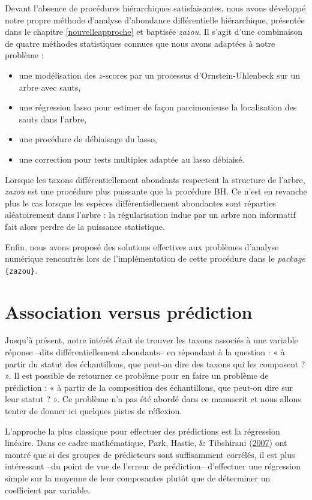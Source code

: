 \documentclass[12pt,a4paper]{reedthesis}
\theoremstyle{definition}
\theoremstyle{definition}
\theoremstyle{definition}
\theoremstyle{remark}
\begin{document}
Devant l'absence de procédures hiérarchiques satisfaisantes, nous avons développé notre propre méthode d'analyse d'abondance différentielle hiérarchique, présentée dans le chapitre \ref{nouvelleapproche} et baptisée \emph{zazou}. Il s'agit d'une combinaison de quatre méthodes statistiques connues que nous avons adaptées à notre problème :
\begin{itemize}
\item
  une modélisation des \(z\)-scores par un processus d'Ornstein-Uhlenbeck sur un arbre avec sauts,
\item
  une régression lasso pour estimer de façon parcimonieuse la localisation des sauts dans l'arbre,
\item
  une procédure de débiaisage du lasso,
\item
  une correction pour tests multiples adaptée au lasso débiaisé.
\end{itemize}
Lorsque les taxons différentiellement abondants respectent la structure de l'arbre, \emph{zazou} est une procédure plus puissante que la procédure BH. Ce n'est en revanche plus le cas lorsque les espèces différentiellement abondantes sont réparties aléatoirement dans l'arbre : la régularisation indue par un arbre non informatif fait alors perdre de la puissance statistique.

Enfin, nous avons proposé des solutions effectives aux problèmes d'analyse numérique rencontrés lors de l'implémentation de cette procédure dans le \emph{package} \texttt{\{zazou\}}.

\hypertarget{association-versus-pruxe9diction}{%
\section*{Association versus prédiction}\label{association-versus-pruxe9diction}}

Jusqu'à présent, notre intérêt était de trouver les taxons associés à une variable réponse --dits différentiellement abondants-- en répondant à la question : « à partir du statut des échantillons, que peut-on dire des taxons qui les composent ? ». Il est possible de retourner ce problème pour en faire un problème de prédiction : « à partir de la composition des échantillons, que peut-on dire sur leur statut ? ». Ce problème n'a pas été abordé dans ce manuscrit et nous allons tenter de donner ici quelques pistes de réflexion.

L'approche la plus classique pour effectuer des prédictions est la régression linéaire. Dans ce cadre mathématique, Park, Hastie, \& Tibshirani (\protect\hyperlink{ref-park2007averaged}{2007}) ont montré que si des groupes de prédicteurs sont suffisamment corrélés, il est plus intéressant --du point de vue de l'erreur de prédiction-- d'effectuer une régression simple sur la moyenne de leur composantes plutôt que de déterminer un coefficient par variable.
\end{document}
